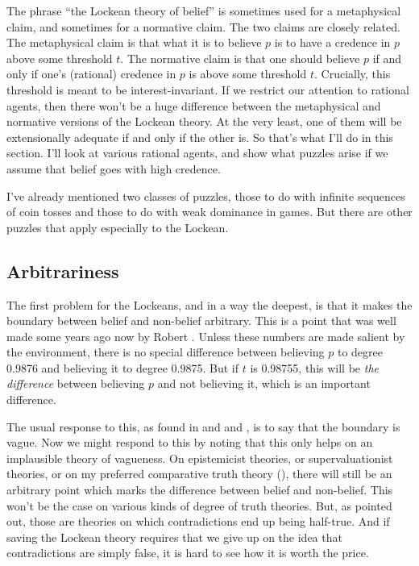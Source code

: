 \documentclass[11pt,]{book}
\begin{document}
The phrase ``the Lockean theory of belief'' is sometimes used for a metaphysical claim, and sometimes for a normative claim. The two claims are closely related. The metaphysical claim is that what it is to believe \(p\) is to have a credence in \(p\) above some threshold \(t\). The normative claim is that one should believe \(p\) if and only if one's (rational) credence in \(p\) is above some threshold \(t\). Crucially, this threshold is meant to be interest-invariant. If we restrict our attention to rational agents, then there won't be a huge difference between the metaphysical and normative versions of the Lockean theory. At the very least, one of them will be extensionally adequate if and only if the other is. So that's what I'll do in this section. I'll look at various rational agents, and show what puzzles arise if we assume that belief goes with high credence.

I've already mentioned two classes of puzzles, those to do with infinite sequences of coin tosses and those to do with weak dominance in games. But there are other puzzles that apply especially to the Lockean.

\hypertarget{lockearb}{%
\subsection{Arbitrariness}\label{lockearb}}

The first problem for the Lockeans, and in a way the deepest, is that it makes the boundary between belief and non-belief arbitrary. This is a point that was well made some years ago now by Robert \citet[91]{Stalnaker1984}. Unless these numbers are made salient by the environment, there is no special difference between believing \(p\) to degree 0.9876 and believing it to degree 0.9875. But if \(t\) is 0.98755, this will be \emph{the difference} between believing \(p\) and not believing it, which is an important difference.

The usual response to this, as found in \citet[Ch. 4]{Foley1993} and \citet{Hunter1996} and \citet{Lee2017b}, is to say that the boundary is vague. Now we might respond to this by noting that this only helps on an implausible theory of vagueness. On epistemicist theories, or supervaluationist theories, or on my preferred comparative truth theory (\citet{Weatherson2005b}), there will still be an arbitrary point which marks the difference between belief and non-belief. This won't be the case on various kinds of degree of truth theories. But, as \citet{Williamson1994} pointed out, those are theories on which contradictions end up being half-true. And if saving the Lockean theory requires that we give up on the idea that contradictions are simply false, it is hard to see how it is worth the price.
\end{document}

